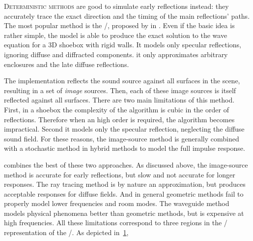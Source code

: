 \mynewline
\textsc{Deterministic methods} are good to simulate early reflections instead:
they accurately trace the exact direction and the timing of the main reflections' paths.
The most popular method is the \ISMdef/, proposed by \citeauthor{allen1979image} in .
Even if the basic idea is rather simple, the model is able to produce the exact solution to the wave equation for a 3D shoebox with rigid walls.
It models only specular reflections, ignoring diffuse and diffracted components.
it only approximates arbitrary enclosures and the late diffuse reflections.


\mynewline
The implementation reflects the sound source against all surfaces in the scene, resulting in a set of \textit{image} sources.
Then, each of these image sources is itself reflected against all surfaces.
There are two main limitations of this method.
First, in a shoebox the complexity of the algorithm is cubic in the order of reflections. Therefore when an high order is required, the algorithm becomes impractical.
Second it models only the specular reflection, neglecting the diffuse sound field.
For these reasons, the image-source method is generally combined with a stochastic method in hybrid methods to model the full impulse response.

 combines the best of these two approaches.
As discussed above, the image-source method is accurate for early reflections, but slow and not accurate for longer responses.
The ray tracing method is by nature an approximation, but produces acceptable responses for diffuse fields.
And in general geometric methods fail to properly model lower frequencies and room modes.
The waveguide method models physical phenomena better than geometric methods, but is expensive at high frequencies.
All these limitations correspond to three regions in the \TFdef/ representation of the \RIR/.
As depicted in~\cref{fig:acoustics:rir_regions},

\begin{figure}[t]
    \begin{fullwidth}

        \resizebox{\linewidth}{!}{
            
            }
            \label{fig:acoustics:rir_regions}
    \end{fullwidth}
\end{figure}


